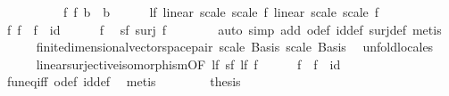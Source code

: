 \begin{isabellebody}
%
\isadelimproof
%
\endisadelimproof
%
\isatagproof
{}\isamarkupfalse%
\ {\isacharminus}{\kern0pt}\isanewline
\ \ \isacommand{{\isacharbraceleft}{\kern0pt}}\isamarkupfalse%
\isanewline
\ \ \ \ \isamarkupfalse%
\ f\ f{\isacharprime}{\kern0pt}{\isacharcolon}{\kern0pt}{\isacharcolon}{\kern0pt}\ {\isachardoublequoteopen}{\isacharprime}{\kern0pt}b\ {\isasymRightarrow}\ {\isacharprime}{\kern0pt}b{\isachardoublequoteclose}\isanewline
\ \ \ \ \isamarkupfalse%
\ lf{\isacharcolon}{\kern0pt}\ {\isachardoublequoteopen}linear\ scale\ scale\ f{\isachardoublequoteclose}\ {\isachardoublequoteopen}linear\ scale\ scale\ f{\isacharprime}{\kern0pt}{\isachardoublequoteclose}\isanewline
\ \ \ \ \isamarkupfalse%
\ f{\isacharcolon}{\kern0pt}\ {\isachardoublequoteopen}f\ {\isasymcirc}\ f{\isacharprime}{\kern0pt}\ {\isacharequal}{\kern0pt}\ id{\isachardoublequoteclose}\isanewline
\ \ \ \ \isamarkupfalse%
\ f\ \isamarkupfalse%
\ sf{\isacharcolon}{\kern0pt}\ {\isachardoublequoteopen}surj\ f{\isachardoublequoteclose}\isanewline
\ \ \ \ \ \ \isamarkupfalse%
\ {\isacharparenleft}{\kern0pt}auto\ simp\ add{\isacharcolon}{\kern0pt}\ o{\isacharunderscore}{\kern0pt}def\ id{\isacharunderscore}{\kern0pt}def\ surj{\isacharunderscore}{\kern0pt}def{\isacharparenright}{\kern0pt}\ metis\isanewline
\ \ \ \ \isamarkupfalse%
\ finite{\isacharunderscore}{\kern0pt}dimensional{\isacharunderscore}{\kern0pt}vector{\isacharunderscore}{\kern0pt}space{\isacharunderscore}{\kern0pt}pair\ scale\ Basis\ scale\ Basis\ \isamarkupfalse%
\ unfold{\isacharunderscore}{\kern0pt}locales\isanewline
\ \ \ \ \isamarkupfalse%
\ linear{\isacharunderscore}{\kern0pt}surjective{\isacharunderscore}{\kern0pt}isomorphism{\isacharbrackleft}{\kern0pt}OF\ lf{\isacharparenleft}{\kern0pt}{}{\isacharparenright}{\kern0pt}\ sf{\isacharbrackright}{\kern0pt}\ lf\ f\isanewline
\ \ \ \ \isamarkupfalse%
\ {\isachardoublequoteopen}f{\isacharprime}{\kern0pt}\ {\isasymcirc}\ f\ {\isacharequal}{\kern0pt}\ id{\isachardoublequoteclose}\isanewline
\ \ \ \ \ \ \isamarkupfalse%
\ fun{\isacharunderscore}{\kern0pt}eq{\isacharunderscore}{\kern0pt}iff\ o{\isacharunderscore}{\kern0pt}def\ id{\isacharunderscore}{\kern0pt}def\ \isamarkupfalse%
\ metis\isanewline
\ \ \isacommand{{\isacharbraceright}{\kern0pt}}\isamarkupfalse%
\isanewline
\ \ \isamarkupfalse%
\ \isamarkupfalse%
\ {\isacharquery}{\kern0pt}thesis\isanewline

\end{isabellebody}
